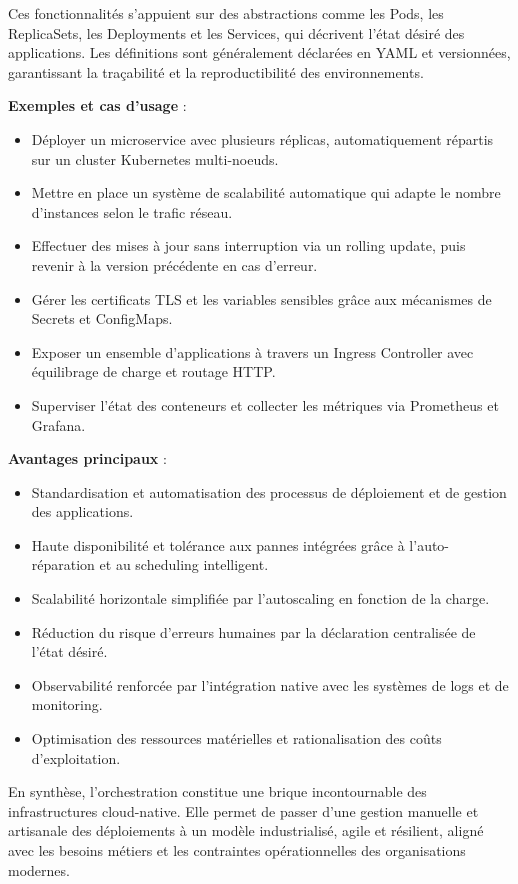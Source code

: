 Ces fonctionnalités s’appuient sur des abstractions comme les Pods, les ReplicaSets, les Deployments et les Services, qui décrivent l’état désiré des applications. Les définitions sont généralement déclarées en YAML et versionnées, garantissant la traçabilité et la reproductibilité des environnements.

\textbf{Exemples et cas d’usage} :
\begin{itemize}
	\item Déployer un microservice avec plusieurs réplicas, automatiquement répartis sur un cluster Kubernetes multi-noeuds.
	\item Mettre en place un système de scalabilité automatique qui adapte le nombre d’instances selon le trafic réseau.
	\item Effectuer des mises à jour sans interruption via un rolling update, puis revenir à la version précédente en cas d’erreur.
	\item Gérer les certificats TLS et les variables sensibles grâce aux mécanismes de Secrets et ConfigMaps.
	\item Exposer un ensemble d’applications à travers un Ingress Controller avec équilibrage de charge et routage HTTP.
	\item Superviser l’état des conteneurs et collecter les métriques via Prometheus et Grafana.
\end{itemize}

\textbf{Avantages principaux} :
\begin{itemize}
	\item Standardisation et automatisation des processus de déploiement et de gestion des applications.
	\item Haute disponibilité et tolérance aux pannes intégrées grâce à l’auto-réparation et au scheduling intelligent.
	\item Scalabilité horizontale simplifiée par l’autoscaling en fonction de la charge.
	\item Réduction du risque d’erreurs humaines par la déclaration centralisée de l’état désiré.
	\item Observabilité renforcée par l’intégration native avec les systèmes de logs et de monitoring.
	\item Optimisation des ressources matérielles et rationalisation des coûts d’exploitation.
\end{itemize}

En synthèse, l’orchestration constitue une brique incontournable des infrastructures cloud-native. Elle permet de passer d’une gestion manuelle et artisanale des déploiements à un modèle industrialisé, agile et résilient, aligné avec les besoins métiers et les contraintes opérationnelles des organisations modernes.

